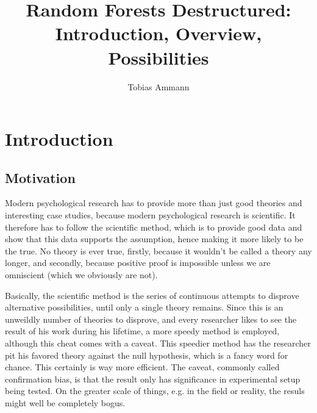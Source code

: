 \documentclass[a4paper,man,12pt,apacite]{apa6} %
\begin{document}
\title{Random Forests Destructured: Introduction, Overview, Possibilities}
\author{Tobias Ammann}


\maketitle

\tableofcontents

\section{Introduction}

\subsection{Motivation}
Modern psychological research has to provide more than just good theories
and interesting case studies, because modern psychological research is
scientific. It therefore has to follow the scientific method, which is to
provide good data and show that this data supports the assumption, hence
making it more likely to be the true. No theory is ever true, firstly,
because it wouldn't be called a theory any longer, and secondly, because
positive proof is impossible unless we are omniscient
(which we obviously are not).

Basically, the scientific method is the series of continuous attempts to
disprove alternative possibilities, until only a single theory remains.
Since this is an unweildly number of theories to disprove, and every
researcher likes to see the result of his work during his lifetime, a
more speedy method is employed, although this cheat comes with a caveat.
This speedier method has the researcher pit his favored theory against
the null hypothesis, which is a fancy word for chance. This certainly is
way more efficient. The caveat, commonly called confirmation bias, is that
the result only has significance in experimental setup being tested.
On the greater scale of things, e.g. in the field or reality, the resuls
might well be completely bogus.
\end{document}
